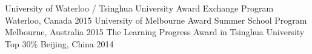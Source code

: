 \begin{cvhonors}
  \cvhonor
    {University of Waterloo / Tsinghua University Award}
    {Exchange Program}
    {Waterloo, Canada}
    {2015}
  \cvhonor
    {University of Melbourne Award}
    {Summer School Program}
    {Melbourne, Australia}
    {2015}
  \cvhonor
    {The Learning Progress Award in Tsinghua University}
    {Top 30\%}
    {Beijing, China}
    {2014}
\end{cvhonors}

